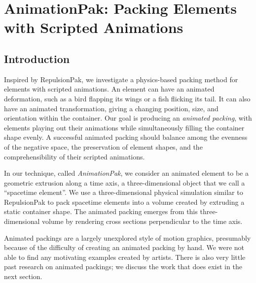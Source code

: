 \chapter{AnimationPak: Packing Elements with Scripted Animations}
\label{chapter_animationpak}


\section{Introduction}
\label{animationpak_introduction}


Inspired by RepulsionPak, we investigate a physics-based
packing method for elements with scripted animations.
An element can have an animated deformation, such as a bird flapping its
wings or a fish flicking its tail.
It can also have an animated transformation, giving a changing
position, size, and orientation within the container.
Our goal is producing an \textit{animated packing}, with elements
playing out their animations while simultaneously filling the
container shape evenly.  A successful animated packing should balance
among the evenness of the negative space, the preservation of 
element shapes, and the comprehensibility of their scripted animations.

In our technique, called \textit{AnimationPak}, we consider an animated
element to be a geometric extrusion along a time axis, a three-dimensional
object that we call a
``spacetime element''.  We use a three-dimensional physical simulation
similar to RepulsionPak to pack spacetime
elements into a volume created by extruding a static container shape.
The animated packing emerges from this three-dimensional volume by rendering 
cross sections perpendicular to the time axis.

Animated packings are a largely unexplored style
of motion graphics, presumably because of the difficulty of creating 
an animated packing by hand.  We were not able to find any motivating
examples created by artists.  There is also very little past research
on animated packings; we discuss the work that does exist in the next
section. 

